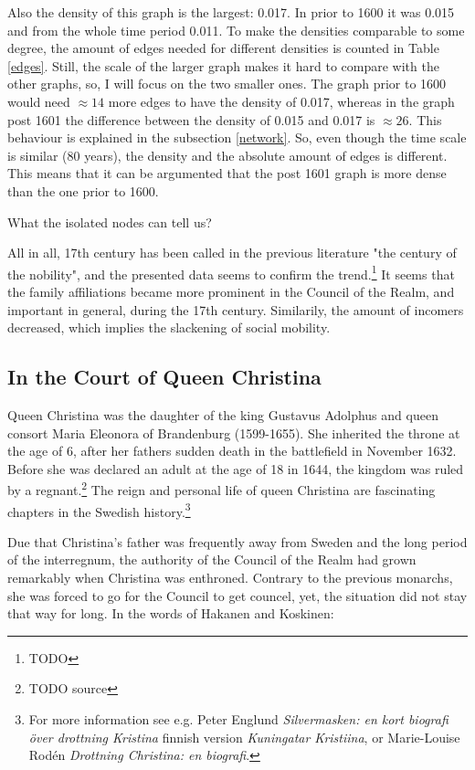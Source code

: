 Also the density of this graph is the largest: 0.017. In prior to 1600 it was 0.015 and from the whole time period 0.011. To make the densities comparable to some degree, the amount of edges needed for different densities is counted in Table \ref{edges}. Still, the scale of the larger graph makes it hard to compare with the other graphs, so, I will focus on the two smaller ones. The graph prior to 1600 would need $\approx 14$ more edges to have the density of 0.017, whereas in the graph post 1601 the difference between the density of 0.015 and 0.017 is $\approx 26$. This behaviour is explained in the subsection \ref{network}. So, even though the time scale is similar (80 years), the density and the absolute amount of edges is different. This means that it can be argumented that the post 1601 graph is more dense than the one prior to 1600. 

What the isolated nodes can tell us?

All in all, 17th century has been called in the previous literature "the century of the nobility", and the presented data seems to confirm the trend.\footnote{TODO} It seems that the family affiliations became more prominent in the Council of the Realm, and important in general, during the 17th century. Similarily, the amount of incomers decreased, which implies the slackening of social mobility.

\subsection{In the Court of Queen Christina}
\label{christina}
Queen Christina was the daughter of the king Gustavus Adolphus and queen consort Maria Eleonora of Brandenburg (1599-1655). She inherited the throne at the age of 6, after her fathers sudden death in the battlefield in November 1632. Before she was declared an adult at the age of 18 in 1644, the kingdom was ruled by a regnant.\footnote{TODO source} The reign and personal life of queen Christina are fascinating chapters in the Swedish history.\footnote{For more information see e.g. Peter Englund \textit{Silvermasken: en kort biografi över drottning Kristina} finnish version \textit{Kuningatar Kristiina}, or Marie-Louise Rodén \textit{Drottning Christina: en biografi}.}

Due that Christina's father was frequently away from Sweden and the long period of the interregnum, the authority of the Council of the Realm had grown remarkably when Christina was enthroned. Contrary to the previous monarchs, she was forced to go for the Council to get councel, yet, the situation did not stay that way for long. In the words of Hakanen and Koskinen: 

